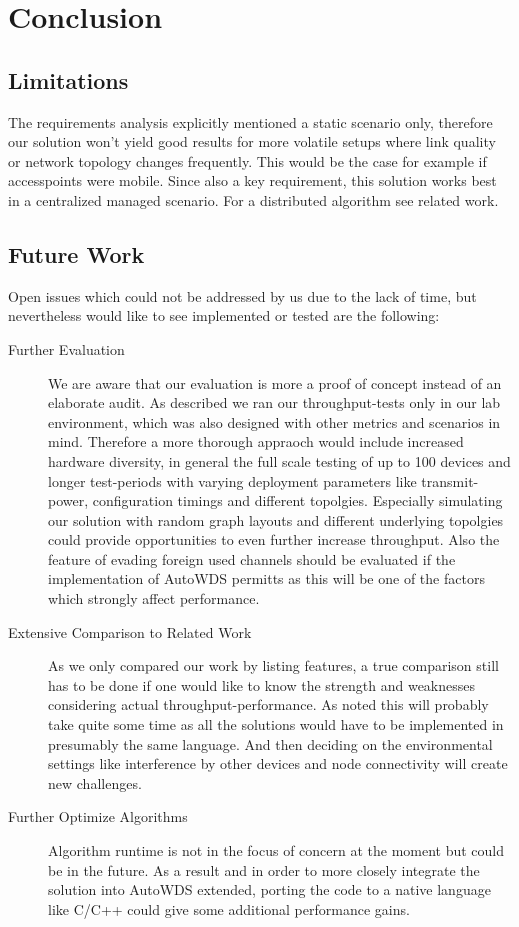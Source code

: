 \chapter{Conclusion}
\section{Limitations}
  The requirements analysis explicitly mentioned a static scenario only, therefore our solution won't yield good results for more volatile setups where link quality or network topology
  changes frequently. This would be the case for example if accesspoints were mobile.
  Since also a key requirement, this solution works best in a centralized managed scenario. For a distributed algorithm see related work.
\section{Future Work}
  Open issues which could not be addressed by us due to the lack of time, but nevertheless would like 
  to see implemented or tested are the following:
  \begin{description}
    \item [Further Evaluation]
      We are aware that our evaluation is more a proof of concept instead of an elaborate audit. As described we ran our throughput-tests only in our lab environment, 
      which was also designed with other metrics and scenarios in mind. Therefore a more thorough appraoch would include increased hardware diversity, in general the full scale
      testing of up to 100 devices and longer test-periods with varying deployment parameters like transmit-power, configuration timings and different topolgies.
      Especially simulating our solution with random graph layouts and different underlying topolgies could provide opportunities to even further increase throughput.
      Also the feature of evading foreign used channels should be evaluated if the implementation of AutoWDS permitts as this will be one of the factors which strongly affect performance.
    \item[Extensive Comparison to Related Work]
      As we only compared our work by listing features, a true comparison still has to be done if one would like to know the strength and weaknesses considering actual throughput-performance.
      As noted this will probably take quite some time as all the solutions would have to be implemented in presumably the same language. And then deciding on the environmental settings
      like interference by other devices and node connectivity will create new challenges.
    \item[Further Optimize Algorithms]
      Algorithm runtime is not in the focus of concern at the moment but could be in the future. As a result and in order to more closely integrate the solution into AutoWDS extended,
      porting the code to a native language like C/C++ could give some additional performance gains.
  \end{description}